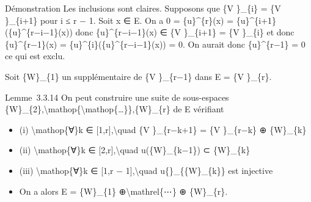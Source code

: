 \documentclass[]{article}
\begin{document}
Démonstration Les inclusions sont claires. Supposons que \{V \}\_\{i\} =
\{V \}\_\{i+1\} pour i ≤ r − 1. Soit x ∈ E. On a 0 = \{u\}\^{}\{r\}(x) =
\{u\}\^{}\{i+1\}(\{u\}\^{}\{r−i−1\}(x)) donc \{u\}\^{}\{r−i−1\}(x) ∈ \{V
\}\_\{i+1\} = \{V \}\_\{i\} et donc \{u\}\^{}\{r−1\}(x) =
\{u\}\^{}\{i\}(\{u\}\^{}\{r−i−1\}(x)) = 0. On aurait donc
\{u\}\^{}\{r−1\} = 0 ce qui est exclu.

Soit \{W\}\_\{1\} un supplémentaire de \{V \}\_\{r−1\} dans E = \{V
\}\_\{r\}.

Lemme~3.3.14 On peut construire une suite de sous-espaces
\{W\}\_\{2\},\textbackslash{}mathop\{\textbackslash{}mathop\{\ldots{}\}\},\{W\}\_\{r\}
de E vérifiant

\begin{itemize}
\itemsep1pt\parskip0pt
\item
  (i) \textbackslash{}mathop\{∀\}k ∈ {[}1,r{]},\textbackslash{}quad \{V
  \}\_\{r−k+1\} = \{V \}\_\{r−k\} ⊕ \{W\}\_\{k\}
\item
  (ii) \textbackslash{}mathop\{∀\}k ∈ {[}2,r{]},\textbackslash{}quad
  u(\{W\}\_\{k−1\}) ⊂ \{W\}\_\{k\}
\item
  (iii) \textbackslash{}mathop\{∀\}k ∈ {[}1,r −
  1{]},\textbackslash{}quad u\{\textbar{}\}\_\{\{W\}\_\{k\}\} est
  injective
\item
  On a alors E = \{W\}\_\{1\} ⊕\textbackslash{}mathrel\{⋯\} ⊕
  \{W\}\_\{r\}.
\end{itemize}
\end{document}
